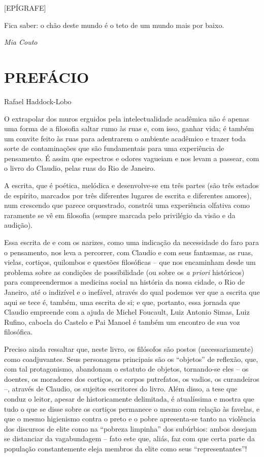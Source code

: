 {[}EPÍGRAFE{]}

Fica saber: o chão deste mundo é o teto de um mundo mais por baixo.

\emph{Mia Couto}

\hypertarget{prefuxe1cio}{%
\section{PREFÁCIO}\label{prefuxe1cio}}

Rafael Haddock-Lobo

O extrapolar dos muros erguidos pela intelectualidade acadêmica não é
apenas uma forma de a filosofia saltar rumo às ruas e, com isso, ganhar
vida; é também um convite feito às ruas para adentrarem o ambiente
acadêmico e trazer toda sorte de contaminações que são fundamentais para
uma experiência de pensamento. É assim que espectros e odores vagueiam e
nos levam a passear, com o livro do Claudio, pelas ruas do Rio de
Janeiro.

A escrita, que é poética, melódica e desenvolve-se em três partes (são
três estados de espírito, marcados por três diferentes lugares de
escrita e diferentes amores), num crescendo que parece orquestrado,
constrói uma experiência olfativa como raramente se vê em filosofia
(sempre marcada pelo privilégio da visão e da audição).

Essa escrita de e com os narizes, como uma indicação da necessidade do
faro para o pensamento, nos leva a percorrer, com Claudio e com seus
fantasmas, as ruas, vielas, cortiços, quilombos e questões filosóficas
-- que nos encaminham desde um problema sobre as condições de
possibilidade (ou sobre os \emph{a priori} históricos) para
compreendermos a medicina social na história da nossa cidade, o Rio de
Janeiro, até o indizível e o inefável, através do qual podemos ver que a
escrita que aqui se tece é, também, uma escrita de si; e que, portanto,
essa jornada que Claudio empreende com a ajuda de Michel Foucault, Luiz
Antonio Simas, Luiz Rufino, cabocla do Castelo e Pai Manoel é também um
encontro de sua voz filosófica.

Preciso ainda ressaltar que, neste livro, os filósofos são postos
(necessariamente) como coadjuvantes. Seus personagens principais são os
``objetos'' de reflexão, que, com tal protagonismo, abandonam o estatuto
de objetos, tornando-se eles -- os doentes, os moradores dos cortiços,
os corpos putrefatos, os vadios, os curandeiros --, através de Claudio,
os sujeitos escritores do livro. Além disso, a tese que conduz o leitor,
apesar de historicamente delimitada, é atualíssima e mostra que tudo o
que se disse sobre os cortiços permanece o mesmo com relação às favelas,
e que o mesmo higienismo contra o preto e o pobre apresenta-se tanto na
violência dos discursos de elite como na ``pobreza limpinha'' dos
subúrbios: ambos desejam se distanciar da vagabundagem -- fato este que,
aliás, faz com que certa parte da população constantemente eleja membros
da elite como seus ``representantes''!

